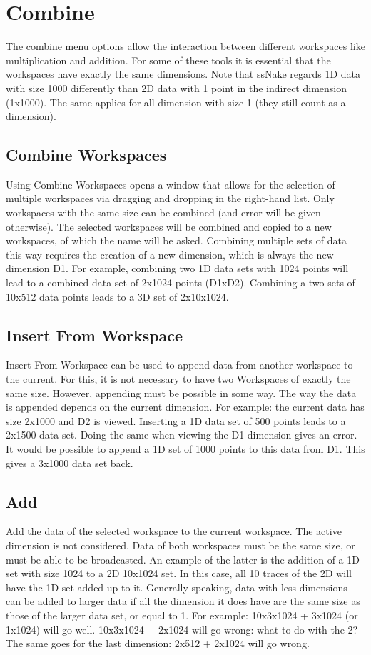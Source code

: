 \documentclass[11pt,a4paper]{article}
\begin{document}
\section{Combine}
The combine menu options allow the interaction between different workspaces like multiplication and addition. For some of these tools it is essential that the workspaces have exactly the same dimensions. Note that ssNake regards 1D data with size 1000 differently than 2D data with 1 point in the indirect dimension (1x1000).
The same applies for all dimension with size 1 (they still count as a dimension).

\subsection{Combine Workspaces}
Using Combine Workspaces opens a window that allows for the selection of multiple workspaces via dragging and dropping in the right-hand list.
Only workspaces with the same size can be combined (and error will be given otherwise). The selected workspaces will be combined and copied to a new workspaces, of which the name will be asked.
Combining multiple sets of data this way requires the creation of a new dimension, which is always the new dimension D1. For example, combining two 1D data sets with 1024 points will lead to a combined data set of 2x1024 points (D1xD2).
Combining a two sets of 10x512 data points leads to a 3D set of 2x10x1024.


\subsection{Insert From Workspace}
Insert From Workspace can be used to append data from another workspace to the current. For this, it is not necessary to have two Workspaces of exactly the same size.
However, appending must be possible in some way. The way the data is appended depends on the current dimension. For example: the current data has size 2x1000 and D2 is viewed. 
Inserting a 1D data set of 500 points leads to a 2x1500 data set. Doing the same when viewing the D1 dimension gives an error. It would be possible to append a 1D set of 1000 points to this data from D1.
This gives a 3x1000 data set back.


\subsection{Add}
Add the data of the selected workspace to the current workspace. The active dimension is not considered. Data of both workspaces must be the same size, or must be able to be broadcasted.
An example of the latter is the addition of a 1D set with size 1024 to a 2D 10x1024 set. In this case, all 10 traces of the 2D will have the 1D set added up to it.
Generally speaking, data with less dimensions can be added to larger data if all the dimension it does have are the same size as those of the larger data set, or equal to 1.
For example: 10x3x1024 + 3x1024 (or 1x1024) will go well. 10x3x1024 + 2x1024 will go wrong: what to do with the 2? The same goes for the last dimension: 2x512 + 2x1024 will go wrong.
\end{document}
